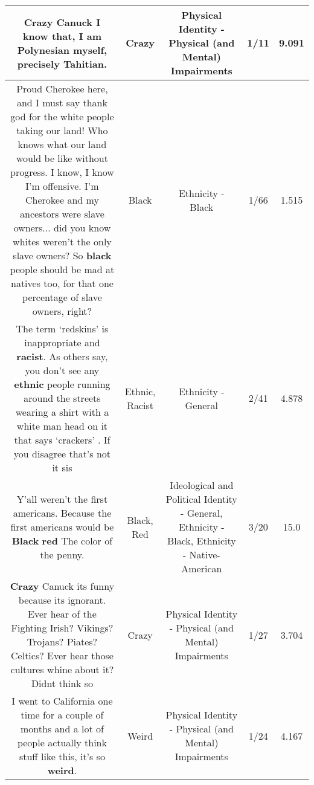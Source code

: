\documentclass[11pt]{article}
\newlength\mylength
\begin{document}
\begin{center}
\begin{longtable}{|C{.65\mylength}|C{.30\mylength}|C{.12\mylength}|C{.12\mylength}|C{.12\mylength}|}
  \small Crazy Canuck I know that, I am Polynesian myself, precisely Tahitian.\normalsize   & Crazy & Physical Identity - Physical (and Mental) Impairments & 1/11 & 9.091 \\  \hline
  \small Proud Cherokee here, and I must say thank god for the white people taking our land! Who knows what our land would be like without progress. I know, I know I'm offensive. I'm Cherokee and my ancestors were slave owners... did you know whites weren't the only slave owners? So \textbf{black} people should be mad at natives too, for that one percentage of slave owners, right?\normalsize   & Black & Ethnicity - Black & 1/66 & 1.515 \\  \hline
  \small The term ‘redskins' is inappropriate and \textbf{racist}. As others say, you don't see any \textbf{ethnic} people running around the streets wearing a shirt with a white man head on it that says ‘crackers' . If you disagree that's not it sis\normalsize   & Ethnic, Racist & Ethnicity - General & 2/41 & 4.878 \\  \hline
  \small Y'all weren't the first americans. Because the first americans would be \textbf{Black}  \textbf{r\textbf{ed}}  The color of the penny.\normalsize   & Black, Red &  Ideological and Political Identity - General, Ethnicity - Black, Ethnicity - Native-American & 3/20 & 15.0 \\  \hline
  \small \@\textbf{Crazy} Canuck its funny because its ignorant. Ever hear of the Fighting Irish? Vikings? Trojans? Piates? Celtics? Ever hear those cultures whine about it? Didnt think so\normalsize   & Crazy & Physical Identity - Physical (and Mental) Impairments & 1/27 & 3.704 \\  \hline
  \small I went to California one time for a couple of months and a lot of people actually think stuff like this, it's so \textbf{weird}.\normalsize   & Weird & Physical Identity - Physical (and Mental) Impairments & 1/24 & 4.167 \\  \hline

\end{longtable}
\end{center}
\end{document}

